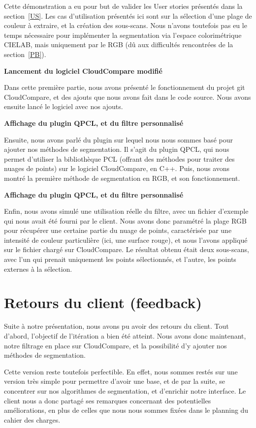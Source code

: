 \documentclass[12pt,titlepage,french]{article}
\begin{document}
Cette démonstration a eu pour but de valider les User stories présentés dans la section~\ref{US}. Les cas d'utilisation présentés ici sont sur la sélection d'une plage de couleur à extraire, et la création des sous-scans. Nous n'avons toutefois pas eu le temps nécessaire pour implémenter la segmentation via l'espace colorimétrique CIELAB, mais uniquement par le RGB (dû aux difficultés rencontrées de la section~\ref{PB}).

\textbf{Lancement du logiciel CloudCompare modifié}

Dans cette première partie, nous avons présenté le fonctionnement du projet git CloudCompare, et des ajouts que nous avons fait dans le code source. Nous avons ensuite lancé le logiciel avec nos ajouts.

\textbf{Affichage du plugin QPCL, et du filtre personnalisé}

Ensuite, nous avons parlé du plugin sur lequel nous nous sommes basé pour ajouter nos méthodes de segmentation. Il s'agit du plugin QPCL, qui nous permet d'utiliser la bibliothèque PCL (offrant des méthodes pour traiter des nuages de points) sur le logiciel CloudCompare, en C++. Puis, nous avons montré la première méthode de segmentation en RGB, et son fonctionnement.

\textbf{Affichage du plugin QPCL, et du filtre personnalisé}

Enfin, nous avons simulé une utilisation réelle du filtre, avec un fichier d'exemple qui nous avait été fourni par le client. Nous avons donc paramétré la plage RGB pour récupérer une certaine partie du nuage de points, caractérisée par une intensité de couleur particulière (ici, une surface rouge), et nous l'avons appliqué sur le fichier chargé sur CloudCompare. Le résultat obtenu était deux sous-scans, avec l'un qui prenait uniquement les points sélectionnés, et l'autre, les points externes à la sélection.

\section{Retours du client (feedback)}

Suite à notre présentation, nous avons pu avoir des retours du client. Tout d'abord, l'objectif de l'itération a bien été atteint. Nous avons donc maintenant, notre filtrage en place sur CloudCompare, et la possibilité d'y ajouter nos méthodes de segmentation.

Cette version reste toutefois perfectible. En effet, nous sommes restés sur une version très simple pour permettre d'avoir une base, et de par la suite, se concentrer sur nos algorithmes de segmentation, et d'enrichir notre interface. Le client nous a donc partagé ses remarques concernant des potentielles améliorations, en plus de celles que nous nous sommes fixées dans le planning du cahier des charges.
\end{document}
